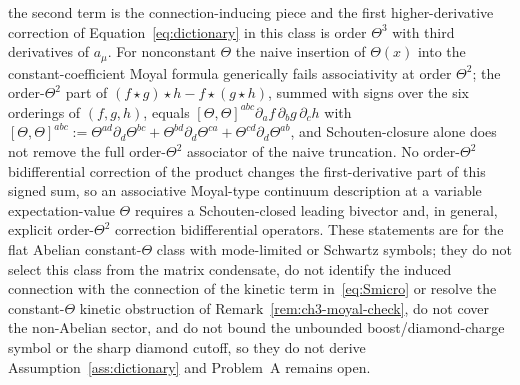 the second term is the connection-inducing piece and the first higher-derivative
correction of Equation~\eqref{eq:dictionary} in this class is order \(\Theta^3\) with
third derivatives of \(a_\mu\). For nonconstant \(\Theta\) the naive insertion of
\(\Theta(x)\) into the constant-coefficient Moyal formula generically fails associativity
at order \(\Theta^2\); the order-\(\Theta^2\) part of \((f\star g)\star h-f\star(g\star h)\),
summed with signs over the six orderings of \((f,g,h)\), equals
\([\Theta,\Theta]^{abc}\partial_af\,\partial_bg\,\partial_ch\) with
\([\Theta,\Theta]^{abc}:=\Theta^{ad}\partial_d\Theta^{bc}
+\Theta^{bd}\partial_d\Theta^{ca}+\Theta^{cd}\partial_d\Theta^{ab}\), and
Schouten-closure alone does not remove the full order-\(\Theta^2\) associator of the
naive truncation. No order-\(\Theta^2\) bidifferential correction of the product changes
the first-derivative part of this signed sum, so an associative Moyal-type continuum
description at a variable expectation-value \(\Theta\) requires a Schouten-closed leading
bivector and, in general, explicit order-\(\Theta^2\) correction bidifferential operators.
These statements are for the flat Abelian constant-\(\Theta\) class with mode-limited or
Schwartz symbols; they do not select this class from the matrix condensate, do not
identify the induced connection with the connection of the kinetic term
in~\eqref{eq:Smicro} or resolve the constant-\(\Theta\) kinetic
obstruction of Remark~\ref{rem:ch3-moyal-check}, do not cover the non-Abelian sector, and
do not bound the unbounded boost/diamond-charge symbol or the sharp diamond cutoff, so
they do not derive Assumption~\ref{ass:dictionary} and Problem~A remains open.

